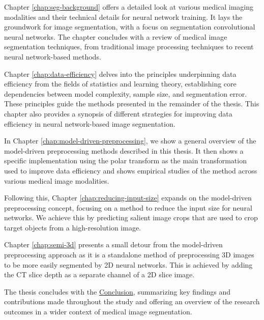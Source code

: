Chapter \ref{chap:seg-background} offers a detailed look at various medical imaging modalities and their technical details for neural network training. It lays the groundwork for image segmentation, with a focus on segmentation convolutional neural networks. The chapter concludes with a review of medical image segmentation techniques, from traditional image processing techniques to recent neural network-based methods.

Chapter \ref{chap:data-efficiency} delves into the principles underpinning data efficiency from the fields of statistics and learning theory, establishing core dependencies between model complexity, sample size, and segmentation error. These principles guide the methods presented in the remainder of the thesis. This chapter also provides a synopsis of different strategies for improving data efficiency in neural network-based image segmentation.

In Chapter \ref{chap:model-driven-preprocessing}, we show a general overview of the model-driven preprocessing methods described in this thesis. It then shows a specific implementation using the polar transform as the main transformation used to improve data efficiency and shows empirical studies of the method across various medical image modalities.

Following this, Chapter \ref{chap:reducing-input-size} expands on the model-driven preprocessing concept, focusing on a method to reduce the input size for neural networks. We achieve this by predicting salient image crops that are used to crop target objects from a high-resolution image.

Chapter \ref{chap:semi-3d} presents a small detour from the model-driven preprocessing approach as it is a standalone method of preprocessing 3D images to be more easily segmented by 2D neural networks. This is achieved by adding the CT slice depth as a separate channel of a 2D slice image.

The thesis concludes with the \hyperref[chap:conclusion]{Conclusion}, summarizing key findings and contributions made throughout the study and offering an overview of the research outcomes in a wider context of medical image segmentation.
